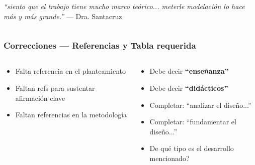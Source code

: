 \documentclass[11pt, aspectratio=169, spanish]{beamer}
\begin{document}
\begin{frame}[plain]
\begin{columns}[T]
\vspace{0.1cm}

\begin{tcolorbox}[colback=NaranjaPend!7, colframe=NaranjaPend!60, arc=2mm,
  left=3pt, right=3pt, top=3pt, bottom=3pt]
{\scriptsize\faQuoteLeft\; \textit{``siento que el trabajo tiene mucho marco teórico... meterle modelación lo hace más y más grande.''} — Dra. Santacruz}
\end{tcolorbox}

\end{columns}
\end{frame}

\begin{frame}[plain]
\frametitle{\faSearch\quad Correcciones — Referencias y Tabla requerida}
\vspace{0pt}

\begin{columns}[T]

\begin{tcolorbox}[colback=AzulInfo!6, colframe=AzulInfo!55, arc=2mm,
  top=2pt, bottom=2pt,
  title={\footnotesize\textbf{\faBookmark\quad Referencias faltantes}}]
{\scriptsize
\begin{itemize}[leftmargin=*, itemsep=1pt]
  \item \colorbox{RojoAlerta!15}{\textcolor{RojoAlerta}{}}\; Falta referencia en el planteamiento
  \item \colorbox{RojoAlerta!15}{\textcolor{RojoAlerta}{}}\; Faltan refs para sustentar afirmación clave
  \item \colorbox{RojoAlerta!15}{\textcolor{RojoAlerta}{}}\; Faltan referencias en la metodología
\end{itemize}}
\end{tcolorbox}

\begin{tcolorbox}[colback=VerdeUNAL!6, colframe=VerdeUNAL!55, arc=2mm,
  top=2pt, bottom=2pt,
  title={\footnotesize\textbf{\faPen\quad Correcciones de forma}}]
{\scriptsize
\begin{itemize}[leftmargin=*, itemsep=1pt]
  \item \colorbox{RojoAlerta!15}{\textcolor{RojoAlerta}{}}\; Debe decir \textbf{``enseñanza''}
  \item \colorbox{RojoAlerta!15}{\textcolor{RojoAlerta}{}}\; Debe decir \textbf{``didácticos''}
  \item \colorbox{RojoAlerta!15}{\textcolor{RojoAlerta}{}}\; Completar: ``analizar el diseño...''
  \item \colorbox{RojoAlerta!15}{\textcolor{RojoAlerta}{}}\; Completar: ``fundamentar el diseño...''
  \item \colorbox{RojoAlerta!15}{\textcolor{RojoAlerta}{}}\; \textquestiondown{}De qué tipo es el desarrollo mencionado?
\end{itemize}}
\end{tcolorbox}


\end{columns}
\end{frame}
\end{document}
